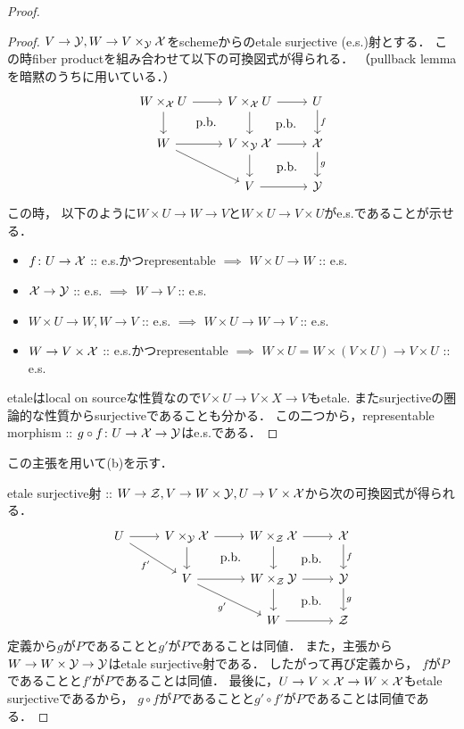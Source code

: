 \begin{proof}
\begin{proof}
            $V \to \mathcal{Y}, W \to V \times_{\mathcal{Y}} \mathcal{X}$をschemeからのetale surjective (e.s.)射とする．
            この時fiber productを組み合わせて以下の可換図式が得られる．
            （pullback lemmaを暗黙のうちに用いている．）
            \[
            \begin{tikzcd}
                W \times_{\shX} U \ar[r]\ar[d]& V \times_{\shX} U \ar[r]\ar[d]& U \ar[d, "f"]\\
                W \ar[r]\ar[dr]& V \times_{\shY} \shX \ar[r]\ar[d]\arpb&
                    \shX \ar[d, "g"]\arpb\\
                {} & V \ar[r]& \shY \arpb
            \end{tikzcd}
            \]
            この時，
            以下のように$W \times U \to W \to V$と$W \times U \to V \times U$がe.s.であることが示せる．
            \begin{itemize}
                \item $f \colon U \to \mathcal{X}$ :: e.s.かつrepresentable $\implies$ $W \times U \to W$ :: e.s.
                \item $\mathcal{X} \to \mathcal{Y}$ :: e.s. $\implies$ $W \to V$ :: e.s.
                \item $W \times U \to W, W \to V$ :: e.s. $\implies$ $W \times U \to W \to V$ :: e.s.
                \item $W \to V \times \mathcal{X}$ :: e.s.かつrepresentable
                            $\implies$ $W \times U=W \times (V \times U) \to V \times U$ :: e.s.
            \end{itemize}
            etaleはlocal on sourceな性質なので$V \times U \to V \times X \to V$もetale.
            またsurjectiveの圏論的な性質からsurjectiveであることも分かる．
            この二つから，representable morphism :: $g \circ f \colon U \to \mathcal{X} \to \mathcal{Y}$はe.s.である．
        \end{proof}
        この主張を用いて(b)を示す．

        etale surjective射 :: $W \to \mathcal{Z}, V \to W \times \mathcal{Y}, U \to V \times \mathcal{X}$から次の可換図式が得られる．
        \[
        \begin{tikzcd}
            U \ar[r]\ar[rd, "f'"']& V \times_{\shY} \shX \ar[r]\ar[d]&
                W \times_{\shZ} \shX \ar[r]\ar[d]& \shX \ar[d, "f"]\\
            {} & V \ar[r]\ar[rd, "g'"']& W \times_{\shZ} \shY \ar[r]\ar[d]\arpb& \shY \ar[d, "g"]\arpb\\
            {} & {} & W \ar[r]& \shZ \arpb
        \end{tikzcd}
        \]
        定義から$g$が$P$であることと$g'$が$P$であることは同値．
        また，主張から$W \to W \times \mathcal{Y} \to \mathcal{Y}$はetale surjective射である．
        したがって再び定義から，
        $f$が$P$であることと$f'$が$P$であることは同値．
        最後に，$U \to V \times \mathcal{X} \to W \times \mathcal{X}$もetale surjectiveであるから，
        $g \circ f$が$P$であることと$g' \circ f'$が$P$であることは同値である．
    \end{proof}

